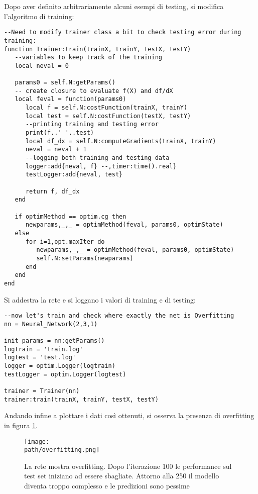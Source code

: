 Dopo aver definito arbitrariamente alcuni esempi di testing, si modifica l'algoritmo di training: 
\begin{lstlisting}[language={[5.2]Lua}]
--Need to modify trainer class a bit to check testing error during training:
function Trainer:train(trainX, trainY, testX, testY)
   --variables to keep track of the training
   local neval = 0

   params0 = self.N:getParams()
   -- create closure to evaluate f(X) and df/dX
   local feval = function(params0)
      local f = self.N:costFunction(trainX, trainY)
      local test = self.N:costFunction(testX, testY)
      --printing training and testing error
      print(f..' '..test)
      local df_dx = self.N:computeGradients(trainX, trainY)
      neval = neval + 1
      --logging both training and testing data
      logger:add{neval, f} --,timer:time().real}
      testLogger:add{neval, test}

      return f, df_dx
   end

   if optimMethod == optim.cg then
      newparams,_,_ = optimMethod(feval, params0, optimState)
   else
      for i=1,opt.maxIter do
         newparams,_,_ = optimMethod(feval, params0, optimState)
         self.N:setParams(newparams)
      end
   end
end
\end{lstlisting}

Si addestra la rete e si loggano i valori di training e di testing: 
\begin{lstlisting}[language={[5.2]Lua}]
--now let's train and check where exactly the net is Overfitting
nn = Neural_Network(2,3,1)

init_params = nn:getParams()
logtrain = 'train.log'
logtest = 'test.log'
logger = optim.Logger(logtrain)
testLogger = optim.Logger(logtest)

trainer = Trainer(nn)
trainer:train(trainX, trainY, testX, testY)
\end{lstlisting}
\bigskip
\bigskip
Andando infine a plottare i dati così ottenuti, si osserva la presenza di overfitting in figura \ref{fig:overfitting}.
\newpage
\begin{figure}[h!]
 \centering
 \texttt{[image: \\path/overfitting.png]}
 \caption{La rete mostra overfitting. Dopo l'iterazione 100 le performance sul test set iniziano ad essere sbagliate. Attorno alla 250 il modello diventa troppo complesso e le predizioni sono pessime}
 \label{fig:overfitting}
\end{figure}


